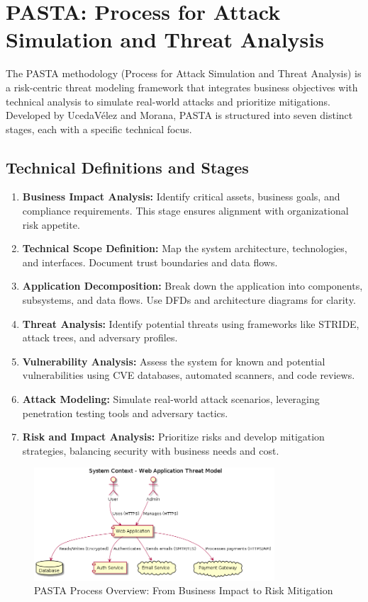 
\section*{PASTA: Process for Attack Simulation and Threat Analysis}
The PASTA methodology (Process for Attack Simulation and Threat Analysis) is a risk-centric threat modeling framework that integrates business objectives with technical analysis to simulate real-world attacks and prioritize mitigations\cite{uceda2015}. Developed by UcedaVélez and Morana, PASTA is structured into seven distinct stages, each with a specific technical focus.

\subsection*{Technical Definitions and Stages}
\begin{enumerate}
	\item \textbf{Business Impact Analysis:} Identify critical assets, business goals, and compliance requirements. This stage ensures alignment with organizational risk appetite.
	\item \textbf{Technical Scope Definition:} Map the system architecture, technologies, and interfaces. Document trust boundaries and data flows.
	\item \textbf{Application Decomposition:} Break down the application into components, subsystems, and data flows. Use DFDs and architecture diagrams for clarity.
	\item \textbf{Threat Analysis:} Identify potential threats using frameworks like STRIDE, attack trees, and adversary profiles.\cite{shostack2014}
	\item \textbf{Vulnerability Analysis:} Assess the system for known and potential vulnerabilities using CVE databases, automated scanners, and code reviews.\cite{owasp}
	\item \textbf{Attack Modeling:} Simulate real-world attack scenarios, leveraging penetration testing tools and adversary tactics.\cite{nist800154}
	\item \textbf{Risk and Impact Analysis:} Prioritize risks and develop mitigation strategies, balancing security with business needs and cost.\cite{uceda2015}
\end{enumerate}

\begin{figure}[H]
	\centering
	\includegraphics[width=0.8\textwidth]{images/system-context}
	\caption{PASTA Process Overview: From Business Impact to Risk Mitigation}
\end{figure}

